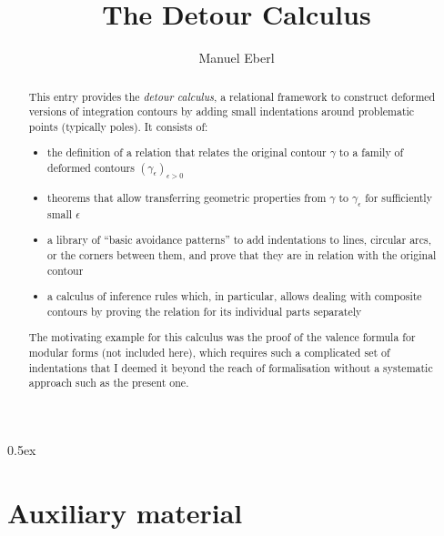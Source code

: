 \documentclass[11pt,a4paper]{article}
\begin{document}
\title{The Detour Calculus}
\author{Manuel Eberl}
\maketitle

\begin{abstract}
This entry provides the \emph{detour calculus}, a relational framework to construct deformed versions of integration contours
by adding small indentations around problematic points (typically poles). It consists of:
\begin{itemize}
\item the definition of a relation that relates the original contour $\gamma$ to a family of deformed contours $(\gamma_\epsilon)_{\epsilon > 0}$
\item theorems that allow transferring geometric properties from $\gamma$ to $\gamma_\epsilon$ for sufficiently small $\epsilon$
\item a library of ``basic avoidance patterns'' to add indentations to lines, circular arcs, or the corners between them, and prove that they are in relation with the original contour
\item a calculus of inference rules which, in particular, allows dealing with composite contours by proving the relation for its individual parts separately
\end{itemize}
The motivating example for this calculus was the proof of the valence formula for modular forms (not included here), which requires such a complicated set of indentations that I deemed it beyond the reach of formalisation without a systematic approach such as the present one.
\end{abstract}

\newpage

\tableofcontents

\newpage
\parindent 0pt\parskip 0.5ex

\section{Auxiliary material}



\raggedright
\end{document}
